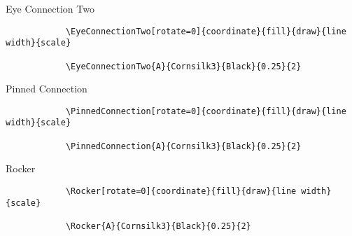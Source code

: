 \documentclass[9pt,xcolor={svgnames, x11names}]{beamer}
\begin{document}
    \begin{frame}[fragile]{Eye Connection Two}

        \footnotesize
        \begin{verbatim}
            \EyeConnectionTwo[rotate=0]{coordinate}{fill}{draw}{line width}{scale}

            \EyeConnectionTwo{A}{Cornsilk3}{Black}{0.25}{2}
        \end{verbatim}
      
        \vspace{1cm}
      
      
    \end{frame}

    
    \begin{frame}[fragile]{Pinned Connection}

        \footnotesize
        \begin{verbatim}
            \PinnedConnection[rotate=0]{coordinate}{fill}{draw}{line width}{scale}

            \PinnedConnection{A}{Cornsilk3}{Black}{0.25}{2}
        \end{verbatim}
      
        \vspace{1cm}
      
      
    \end{frame}

    
    \begin{frame}[fragile]{Rocker}

        \footnotesize
        \begin{verbatim}
            \Rocker[rotate=0]{coordinate}{fill}{draw}{line width}{scale}

            \Rocker{A}{Cornsilk3}{Black}{0.25}{2}
        \end{verbatim}
      
        \vspace{1cm}
      
      
    \end{frame}
\end{document}
